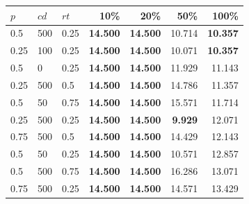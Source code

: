 \begin{tabular}{lllrrrr}
\toprule
\textbf{$p$} & \textbf{$cd$} & \textbf{$rt$} & \textbf{10\%} & \textbf{20\%} & \textbf{50\%} & \textbf{100\%} \\
\midrule
0.5 & 500 & 0.25 & \textbf{14.500} & \textbf{14.500} & 10.714 & \textbf{10.357} \\
0.25 & 100 & 0.25 & \textbf{14.500} & \textbf{14.500} & 10.071 & \textbf{10.357} \\
0.5 & 0 & 0.25 & \textbf{14.500} & \textbf{14.500} & 11.929 & 11.143 \\
0.25 & 500 & 0.5 & \textbf{14.500} & \textbf{14.500} & 14.786 & 11.357 \\
0.5 & 50 & 0.75 & \textbf{14.500} & \textbf{14.500} & 15.571 & 11.714 \\
0.25 & 500 & 0.25 & \textbf{14.500} & \textbf{14.500} & \textbf{9.929} & 12.071 \\
0.75 & 500 & 0.5 & \textbf{14.500} & \textbf{14.500} & 14.429 & 12.143 \\
0.5 & 50 & 0.25 & \textbf{14.500} & \textbf{14.500} & 10.571 & 12.857 \\
0.5 & 500 & 0.75 & \textbf{14.500} & \textbf{14.500} & 16.286 & 13.071 \\
0.75 & 500 & 0.25 & \textbf{14.500} & \textbf{14.500} & 14.571 & 13.429 \\
\bottomrule
\end{tabular}
